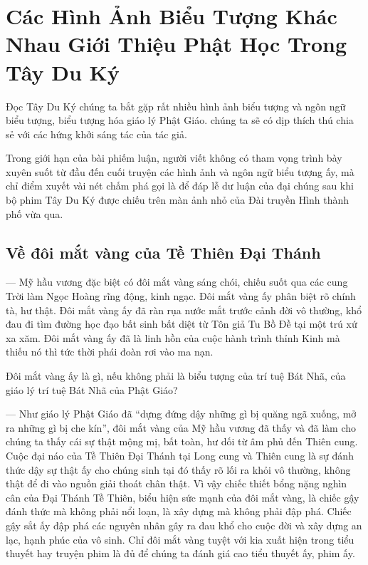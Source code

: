 \chapter{Các Hình Ảnh Biểu Tượng Khác Nhau Giới Thiệu Phật Học Trong Tây Du Ký} %
\label{cha:cac_hinh_anh_bieu_tuong_khac_nhau_gioi_thieu_phat_hoc_trong_tay_du_ky}

Đọc Tây Du Ký chúng ta bắt gặp rất nhiều hình ảnh biểu tượng và ngôn ngữ biểu tượng, biểu tượng hóa giáo lý Phật Giáo. chúng ta sẽ có dịp thích thú chia sẻ với các hứng khởi sáng tác của tác giả.

Trong giới hạn của bài phiếm luận, người viết không có tham vọng trình bày xuyên suốt từ đầu đến cuối truyện các hình ảnh và ngôn ngữ biểu tượng ấy, mà chỉ điểm xuyết vài nét chấm phá gọi là để đáp lễ dư luận của đại chúng sau khi bộ phim Tây Du Ký được chiếu trên màn ảnh nhỏ của Đài truyền Hình thành phố vừa qua.

\section{Về đôi mắt vàng của Tề Thiên Đại Thánh} %
\label{sec:ve_doi_mat_vang_cua_te_thien}

— Mỹ hầu vương đặc biệt có đôi mắt vàng sáng chói, chiếu suốt qua các cung Trời làm Ngọc Hoàng rĩng động, kinh ngạc. Đôi mắt vàng ấy phân biệt rõ chính tà, hư thật. Đôi mắt vàng ấy đã ràn rụa nước mắt trước cảnh đời vô thường, khổ đau đi tìm đường học đạo bất sinh bất diệt từ Tôn giả Tu Bồ Đề tại một trú xứ xa xăm. Đôi mắt vàng ấy đã là linh hồn của cuộc hành trình thỉnh Kinh mà thiếu nó thì tức thời phái đoàn rơi vào ma nạn.

Đôi mắt vàng ấy là gì, nếu không phải là biểu tượng của trí tuệ Bát Nhã, của giáo lý trí tuệ Bát Nhã của Phật Giáo?

— Như giáo lý Phật Giáo đã ``dựng đứng dậy những gì bị quăng ngã xuống, mở ra những gì bị che kín'', đôi mắt vàng của Mỹ hầu vương đã thấy và đã làm cho chúng ta thấy cái sự thật mộng mị, bất toàn, hư dối từ âm phủ đến Thiên cung. Cuộc đại náo của Tề Thiên Đại Thánh tại Long cung và Thiên cung là sự đánh thức dậy sự thật ấy cho chúng sinh tại đó thấy rõ lối ra khỏi vô thường, không thật để đi vào nguồn giải thoát chân thật. Vì vậy chiếc thiết bổng nặng nghìn cân của Đại Thánh Tề Thiên, biểu hiện sức mạnh của đôi mắt vàng, là chiếc gậy đánh thức mà không phải nổi loạn, là xây dựng mà không phải đập phá. Chiếc gậy sắt ấy đập phá các nguyên nhân gây ra đau khổ cho cuộc đời và xây dựng an lạc, hạnh phúc của vô sinh. Chỉ đôi mắt vàng tuyệt với kia xuất hiện trong tiểu thuyết hay truyện phim là đủ để chúng ta đánh giá cao tiểu thuyết ấy, phim ấy.

